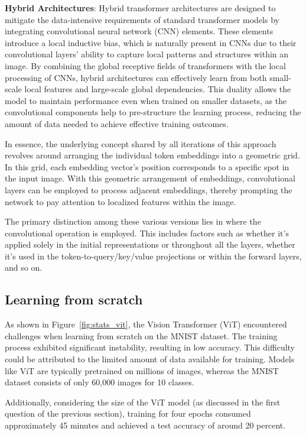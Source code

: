 \textbf{Hybrid Architectures}: Hybrid transformer architectures are designed to mitigate the data-intensive requirements of standard transformer models by integrating convolutional neural network (CNN) elements. These elements introduce a local inductive bias, which is naturally present in CNNs due to their convolutional layers' ability to capture local patterns and structures within an image. By combining the global receptive fields of transformers with the local processing of CNNs, hybrid architectures can effectively learn from both small-scale local features and large-scale global dependencies. This duality allows the model to maintain performance even when trained on smaller datasets, as the convolutional components help to pre-structure the learning process, reducing the amount of data needed to achieve effective training outcomes.

In essence, the underlying concept shared by all iterations of this approach revolves around arranging the individual token embeddings into a geometric grid. In this grid, each embedding vector's position corresponds to a specific spot in the input image. With this geometric arrangement of embeddings, convolutional layers can be employed to process adjacent embeddings, thereby prompting the network to pay attention to localized features within the image.

The primary distinction among these various versions lies in where the convolutional operation is employed. This includes factors such as whether it's applied solely in the initial representations or throughout all the layers, whether it's used in the token-to-query/key/value projections or within the forward layers, and so on.

\subsection{Learning from scratch}
As shown in Figure~\ref{fig:stats_vit}, the Vision Transformer (ViT) encountered challenges when learning from scratch on the MNIST dataset. The training process exhibited significant instability, resulting in low accuracy. This difficulty could be attributed to the limited amount of data available for training. Models like ViT are typically pretrained on millions of images, whereas the MNIST dataset consists of only 60,000 images for 10 classes.

Additionally, considering the size of the ViT model (as discussed in the first question of the previous section), training for four epochs consumed approximately 45 minutes and achieved a test accuracy of around 20 percent.

